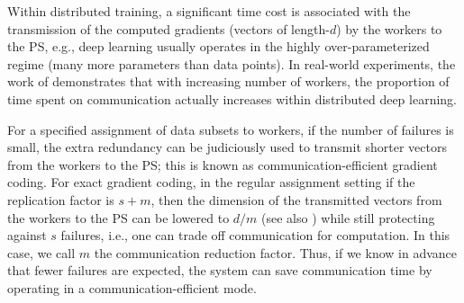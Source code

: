 \documentclass[journal,draftcls,onecolumn]{IEEEtran}
\theoremstyle{mystyle}
\newtheorem{remark}{Remark}
\newcommand{\calD}{\mathcal{D}}
\begin{document}



Within distributed training, a significant time cost is associated with the transmission of the computed gradients (vectors of length-$d$) by the workers to the PS, e.g., deep learning usually operates in the highly over-parameterized regime \cite{Belkin_2019} (many more parameters than data points). In real-world experiments, the work of \cite{alistarh2017qsgd} demonstrates that with increasing number of workers, the proportion of time spent on communication actually increases within distributed deep learning. %

For a specified assignment of data subsets to workers, if the number of failures is small, the extra redundancy can be judiciously used to transmit shorter vectors from the workers to the PS; this is known as communication-efficient gradient coding. 
For exact gradient coding, in the regular assignment setting if the replication factor is $s + m$, then the dimension of the transmitted vectors from the workers to the PS can be lowered to $d/ m$ \cite{YeA18} (see also \cite{tayyebehM21}) while still protecting against $s$ failures, i.e., one can trade off communication for computation. In this case, we call $m$ the communication reduction factor. Thus, if we know in advance that fewer failures are expected, the system can save communication time by operating in a communication-efficient mode.
\end{document}
